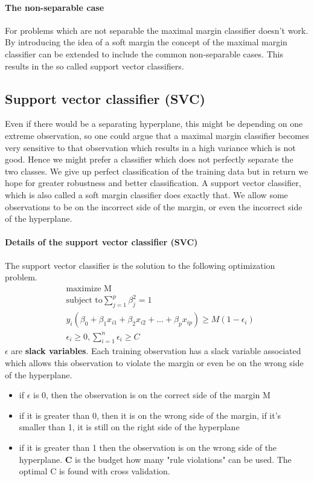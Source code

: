 \documentclass[../document.tex]{subfiles}
\begin{document}
	\paragraph{The non-separable case}
	For problems which are not separable the maximal margin classifier doesn't work. By introducing the idea of a soft margin the concept of the maximal margin classifier can be extended to include the common non-separable cases. This results in the so called support vector classifiers.
	\subsection{Support vector classifier (SVC)}
	Even if there would be a separating hyperplane, this might be depending on one extreme observation, so one could argue that a maximal margin classifier becomes very sensitive to that observation which results in a high variance which is not good. Hence we might prefer a classifier which does not perfectly separate the two classes. We give up perfect classification of the training data but in return we hope for greater robustness and better classification. A support vector classifier, which is also called a soft margin classifier does exactly that. We allow some observations to be on the incorrect side of the margin, or even the incorrect side of the hyperplane.
	\paragraph{Details of the support vector classifier (SVC)}
	The support vector classifier is the solution to the following optimization problem.
	\begin{equation}
	\begin{split}
		&\text{maximize M}\\
		&\text{subject to}\sum_{j=1}^{p}\beta_{j}^2=1\\
		&y_{i}(\beta_{0}+\beta_{1}x_{i1}+\beta_{2}x_{i2}+...+\beta_{p}x_{ip})\ge M(1-\epsilon_{i})\\
		&\epsilon_{i}\ge 0, \sum_{i=1}^{n}\epsilon_{i}\ge C
	\end{split}
	\end{equation}
	\(\epsilon\) are \textbf{slack variables}. Each training observation has a slack variable associated which allows this observation to violate the margin or even be on the wrong side of the hyperplane.
	\begin{itemize}
		\item if \(\epsilon\) is 0, then the observation is on the correct side of the margin M
		\item if it is greater than 0, then it is on the wrong side of the margin, if it's smaller than 1, it is still on the right side of the hyperplane
		\item if it is greater than 1 then the observation is on the wrong side of the hyperplane. \textbf{C} is the budget how many "rule violations" can be used. The optimal C is found with cross validation.
	\end{itemize}
\end{document}
